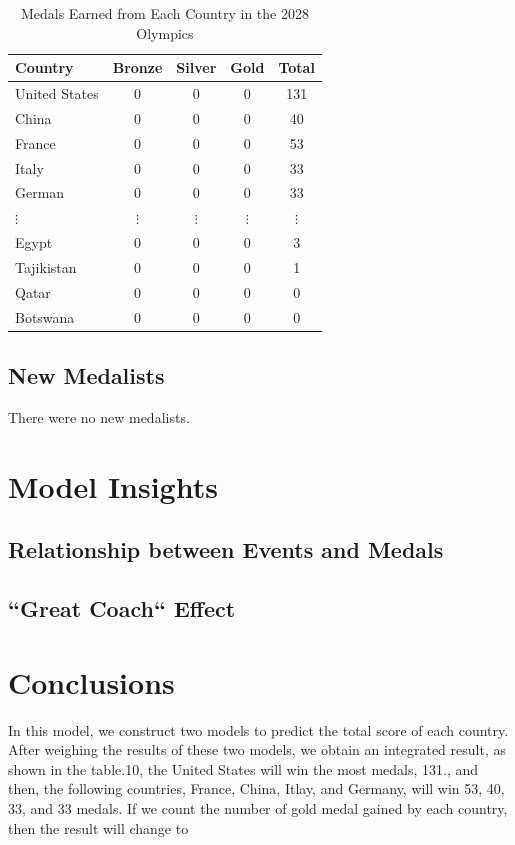\documentclass{mcmthesis}
\begin{document}
\begin{table}[H]
\centering 
\label{c}
\caption{Medals Earned from Each Country in the 2028 Olympics}
\vspace{5pt}
\begin{tabular}{lcccc}
\hline
\textbf{Country} & \textbf{Bronze} & \textbf{Silver} & \textbf{Gold} & \textbf{Total}\\
\hline\hline
United States & 0 & 0 & 0 & 131 \\
China         & 0 & 0 & 0 & 40 \\
France        & 0 & 0 & 0 & 53 \\
Italy         & 0 & 0 & 0 & 33 \\
German        & 0 & 0 & 0 & 33 \\
$\vdots$ & $\vdots$ & $\vdots$ & $\vdots$ & $\vdots$ \\
Egypt         & 0 & 0 & 0 & 3 \\
Tajikistan    & 0 & 0 & 0 & 1 \\
Qatar         & 0 & 0 & 0 & 0 \\
Botswana      & 0 & 0 & 0 & 0 \\
\hline
\end{tabular}
\end{table}

\subsection{New Medalists}

There were no new medalists.

\section{Model Insights}

\subsection{Relationship between Events and Medals}

\subsection{``Great Coach`` Effect}

\section{Conclusions}
In this model, we construct two models to predict the total score of each country. After weighing the results of these two models, we obtain an integrated result, as shown in the table.10, the United States will win the most medals, 131., and then, the following countries, France, China, Itlay, and Germany, will win 53, 40, 33, and 33 medals. If we count the number of gold medal gained by each country, then the result will change to 
\end{document}
